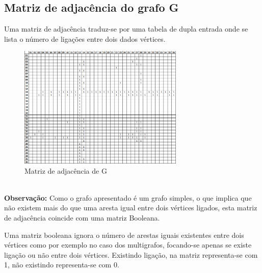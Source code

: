 \subsection{ Matriz de adjacência do grafo G }
Uma matriz de adjacência traduz-se por uma tabela de dupla entrada onde se lista o número de ligações 
entre dois dados vértices.
\begin{figure}[h]
    \centering
    \includegraphics[width=0.7\textwidth]{imgs/FiguraMatrizdeAdj}
    \caption{ Matriz de adjacência de G\label{fig:imagem14}}
\end{figure}\\
\textbf{Observação:} Como o grafo apresentado é um grafo simples, o que implica que não existem mais do que 
uma aresta igual entre dois vértices ligados, esta matriz de adjacência coincide com uma matriz Booleana.\par
Uma matriz booleana ignora o número de arestas iguais existentes entre dois vértices como por exemplo 
no caso dos multigrafos, focando-se apenas se existe ligação ou não entre dois vértices. Existindo ligação, na 
matriz representa-se com 1, não existindo representa-se com 0.\\

